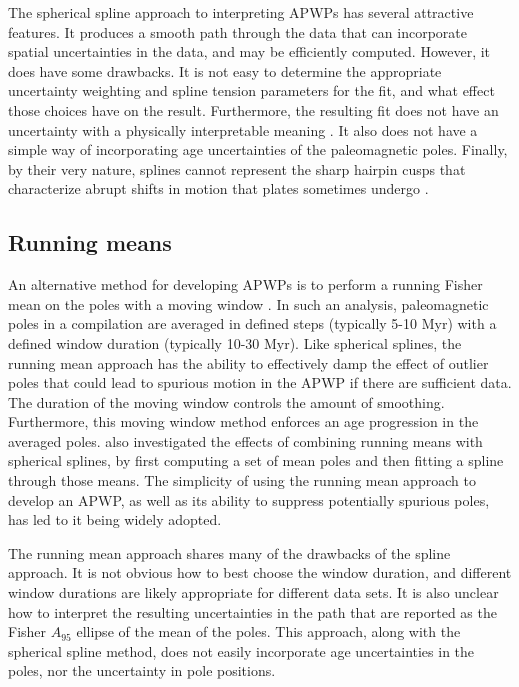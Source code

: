 \documentclass[11pt,letterpaper]{article}
\begin{document}
The spherical spline approach to interpreting APWPs has several attractive features. It produces a smooth path through the data that can incorporate spatial uncertainties in the data, and may be efficiently computed. However, it does have some drawbacks. It is not easy to determine the appropriate uncertainty weighting and spline tension parameters for the fit, and what effect those choices have on the result. Furthermore, the resulting fit does not have an uncertainty with a physically interpretable meaning \citep{Torsvik1996a}. It also does not have a simple way of incorporating age uncertainties of the paleomagnetic poles. Finally, by their very nature, splines cannot represent the sharp hairpin cusps that characterize abrupt shifts in motion that plates sometimes undergo \citep{Irving1972a, Gordon1984a}.

\subsection*{Running means}

An alternative method for developing APWPs is to perform a running Fisher mean on the poles with a moving window \citep{Irving1977a, Van-der-Voo2001a, Torsvik2008a}. In such an analysis, paleomagnetic poles in a compilation are averaged in defined steps (typically 5-10 Myr) with a defined window duration (typically 10-30 Myr). Like spherical splines, the running mean approach has the ability to effectively damp the effect of outlier poles that could lead to spurious motion in the APWP if there are sufficient data. The duration of the moving window controls the amount of smoothing. Furthermore, this moving window method enforces an age progression in the averaged poles. \citet{Torsvik2008a} also investigated the effects of combining running means with spherical splines, by first computing a set of mean poles and then fitting a spline through those means. 
The simplicity of using the running mean approach to develop an APWP, as well as its ability to suppress potentially spurious poles, has led to it being widely adopted.

The running mean approach shares many of the drawbacks of the spline approach.  It is not obvious how to best choose the window duration, and different window durations are likely appropriate for different data sets.  It is also unclear how to interpret the resulting uncertainties in the path that are reported as the Fisher $A_{95}$ ellipse of the mean of the poles. This approach, along with the spherical spline method, does not easily incorporate age uncertainties in the poles, nor the uncertainty in pole positions.
\end{document}
